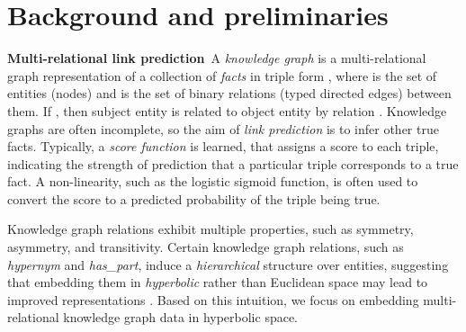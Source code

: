 \documentclass{article}
\newcommand{\keypoint}[1]{\vspace{0.cm}\noindent\textbf{#1}\,}
\begin{document}
\section{Background and preliminaries}
\keypoint{Multi-relational link prediction} A \textit{knowledge graph} is a multi-relational graph representation of a collection  of \textit{facts} in triple form , where  is the set of entities (nodes) and  is the set of binary relations (typed directed edges) between them. If , then subject entity  is related to object entity  by relation . Knowledge graphs are often incomplete, so the aim of \textit{link prediction} is to infer other true facts. Typically, a \textit{score function}  is learned, that assigns a score  to each triple, indicating the strength of prediction that a particular triple corresponds to a true fact. A non-linearity, such as the logistic sigmoid function, is often used to convert the score to a predicted probability  of the triple being true. 

Knowledge graph relations exhibit multiple properties, such as symmetry, asymmetry, and transitivity. Certain knowledge graph relations, such as \textit{hypernym} and \textit{has\_part}, induce a \textit{hierarchical} structure over entities, suggesting that embedding them in \textit{hyperbolic} rather than Euclidean space may lead to improved representations \cite{sarkar2011low, nickel2017poincare, nickel2018learning, ganea2018hyperbolicentail, tifrea2019poincare}. Based on this intuition, we focus on embedding multi-relational knowledge graph data in hyperbolic space.
\end{document}
